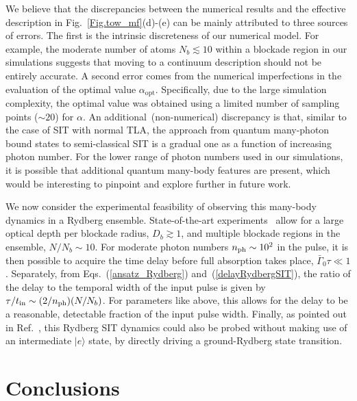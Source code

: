 \documentclass[pra,twocolumn,showpacs,preprintnumbers,amsmath,amssymb]{revtex4-1}
\begin{document}
We believe that the discrepancies between the numerical results and the effective description in Fig.~\ref{Fig.tow_mf}(d)-(e) can be mainly attributed to three sources of errors. The first is the intrinsic discreteness of our numerical model. For example, the moderate number of atoms $N_b\lesssim 10$ within a blockade region in our simulations suggests that moving to a continuum description should not be entirely accurate. A second error comes from the numerical imperfections in the evaluation of the optimal value $\alpha_{\textrm{opt}}$. Specifically, due to the large simulation complexity, the optimal value was obtained using a limited number of sampling points ($\sim 20$) for $\alpha$.  An additional~(non-numerical) discrepancy is that, similar to the case of SIT with normal TLA, the approach from quantum many-photon bound states to semi-classical SIT is a gradual one as a function of increasing photon number. For the lower range of photon numbers used in our simulations, it is possible that additional quantum many-body features are present, which would be interesting to pinpoint and explore further in future work.


We now consider the experimental feasibility of observing this many-body dynamics in a Rydberg ensemble. State-of-the-art experiments~\cite{LiangBS,Hofferberth,Hofferberth2} allow for a large optical depth per blockade radius, $D_b\gtrsim 1$, and multiple blockade regions in the ensemble, $N/N_b\sim 10$. For moderate photon numbers $n_{\rm ph}\sim 10^2$ in the pulse, it is then possible to acquire the time delay before full absorption takes place, $\bar\Gamma_0\tau\ll 1$. Separately, from Eqs.~(\ref{ansatz_Rydberg}) and~(\ref{delayRydbergSIT}), the ratio of the delay to the temporal width of the input pulse is given by $\tau/t_{\rm in}\sim (2/n_{\rm ph})(N/N_b)$. For parameters like above, this allows for the delay to be a reasonable, detectable fraction of the input pulse width.
Finally, as pointed out in Ref.~\cite{Rydberg-SIT}, this Rydberg SIT dynamics could also be probed without making use of an intermediate $|e\rangle$ state, by directly driving a ground-Rydberg state transition.

 
 
 
 







\section{Conclusions}\label{sec:conclusions}
\end{document}
